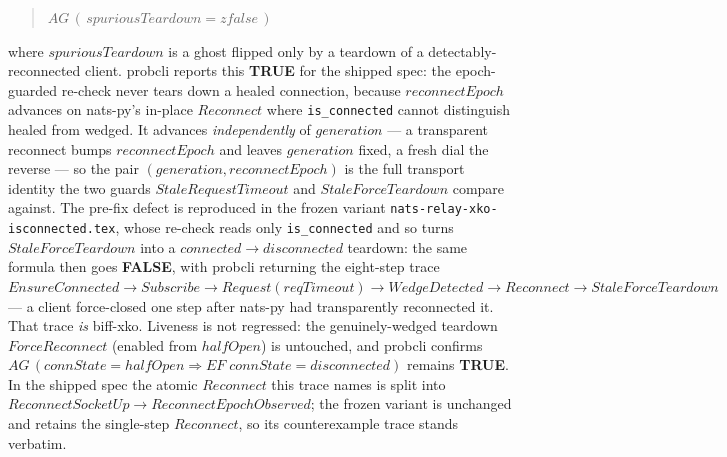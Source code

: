 \documentclass[a4paper,10pt,fleqn]{article}
\begin{document}
\begin{enumerate}
    \begin{quote}
      $AG\,(\,spuriousTeardown = zfalse\,)$
    \end{quote}

    where $spuriousTeardown$ is a ghost flipped only by a teardown of a
    detectably-reconnected client.  probcli reports this \textbf{TRUE}
    for the shipped spec: the epoch-guarded re-check never tears down a
    healed connection, because $reconnectEpoch$ advances on nats-py's
    in-place $Reconnect$ where \texttt{is\_connected} cannot distinguish
    healed from wedged.  It advances \emph{independently} of $generation$
    --- a transparent reconnect bumps $reconnectEpoch$ and leaves
    $generation$ fixed, a fresh dial the reverse --- so the pair
    $(generation, reconnectEpoch)$ is the full transport identity the
    two guards $StaleRequestTimeout$ and $StaleForceTeardown$ compare
    against.  The pre-fix defect is reproduced in the frozen variant
    \texttt{nats-relay-xko-isconnected.tex}, whose re-check reads only
    \texttt{is\_connected} and so turns $StaleForceTeardown$ into a
    $connected \to disconnected$ teardown: the same formula then goes
    \textbf{FALSE}, with probcli returning the eight-step trace
    $EnsureConnected \to Subscribe \to Request(reqTimeout) \to
    WedgeDetected \to Reconnect \to StaleForceTeardown$ --- a client
    force-closed one step after nats-py had transparently reconnected it.
    That trace \emph{is} biff-xko.  Liveness is not regressed: the
    genuinely-wedged teardown $ForceReconnect$ (enabled from $halfOpen$)
    is untouched, and probcli confirms $AG\,(connState = halfOpen
    \Rightarrow EF\;connState = disconnected)$ remains \textbf{TRUE}.
    In the shipped spec the atomic $Reconnect$ this trace names is split
    into $ReconnectSocketUp \to ReconnectEpochObserved$; the frozen
    variant is unchanged and retains the single-step $Reconnect$, so its
    counterexample trace stands verbatim.


\end{enumerate}
\end{document}
